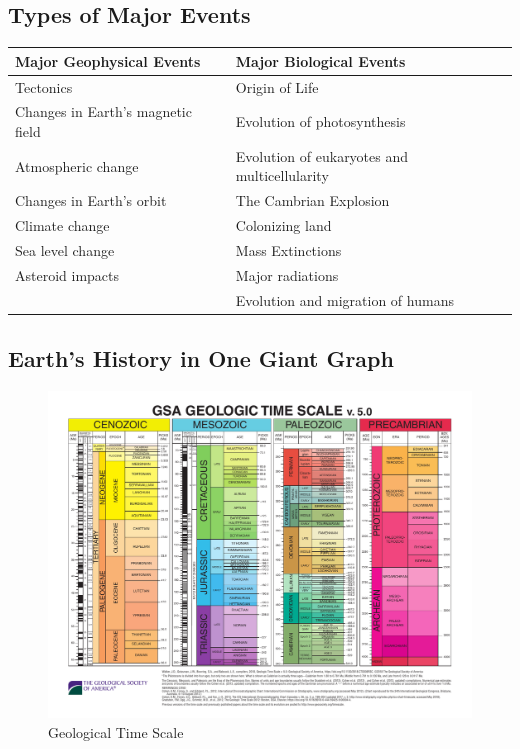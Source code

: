\documentclass[12pt]{article}
\begin{document}
\subsection{Types of Major Events}

\begin{table}[tph]
    \centering
    \begin{tabular}{| l | l |}
        \hline
        Major Geophysical Events          & Major Biological Events                      \\
        \hline
        Tectonics                         & Origin of Life                               \\
        Changes in Earth's magnetic field & Evolution of photosynthesis                  \\
        Atmospheric change                & Evolution of eukaryotes and multicellularity \\
        Changes in Earth's orbit          & The Cambrian Explosion                       \\
        Climate change                    & Colonizing land                              \\
        Sea level change                  & Mass Extinctions                             \\
        Asteroid impacts                  & Major radiations                             \\
                                          & Evolution and migration of humans            \\
        \hline
    \end{tabular}
\end{table}

\subsection{Earth's History in One Giant Graph}

\begin{figure}[tph]
    \centering
    \includegraphics[width=\linewidth]{timescl.pdf}
    \caption{Geological Time Scale} \label{timescl}
\end{figure}
\end{document}
